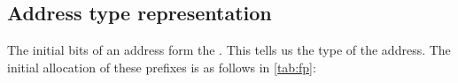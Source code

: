 \documentclass[dvipsnames]{article}
\begin{document}









\subsection{Address type representation}

The initial bits of an address form the . This tells us
the type of the address. The initial allocation of these prefixes is as follows
in \cref{tab:fp}:
\end{document}
